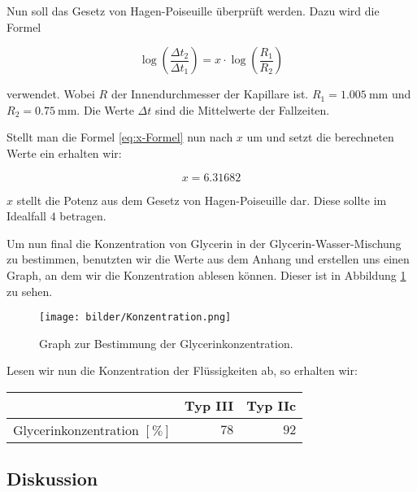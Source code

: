             Nun soll das Gesetz von Hagen-Poiseuille überprüft werden. Dazu wird die Formel

            \begin{equation}
                \log\left(\frac{\Delta t_{2}}{\Delta t_{1}}\right) = x \cdot \log\left(\frac{R_{1}}{R_{2}}\right)
                \label{eq:x-Formel}
            \end{equation}

            verwendet. Wobei $R$ der Innendurchmesser der Kapillare ist. $R_{1} = 1.005\ \mathrm{mm}$ und $R_{2} = 0.75\ \mathrm{mm}$. Die Werte $\Delta t$ sind die Mittelwerte der Fallzeiten.

            Stellt man die Formel \ref{eq:x-Formel} nun nach $x$ um und setzt die berechneten Werte ein erhalten wir:

            $$x = 6.31682$$

            $x$ stellt die Potenz aus dem Gesetz von Hagen-Poiseuille dar. Diese sollte im Idealfall $4$ betragen.

            Um nun final die Konzentration von Glycerin in der Glycerin-Wasser-Mischung zu bestimmen, benutzten wir die Werte aus dem Anhang und erstellen uns einen Graph, an dem wir die Konzentration ablesen können. Dieser ist in Abbildung \ref{fig:GraphKonzentration} zu sehen.

            \begin{figure}[H]
                \centering
                \texttt{[image: bilder/Konzentration.png]}
                \caption{Graph zur Bestimmung der Glycerinkonzentration.}
                \label{fig:GraphKonzentration}
            \end{figure}

            Lesen wir nun die Konzentration der Flüssigkeiten ab, so erhalten wir:

            \begin{table}[H]
                \centering
                \begin{tabular}{|l||r|r|}
                    \hline
                    & Typ III & Typ IIc\\
                    \hline\hline
                    Glycerinkonzentration $[\mathrm{\%}]$ & $78$ & $92$\\
                    \hline
                \end{tabular}
            \end{table}

        \subsection{Diskussion}

